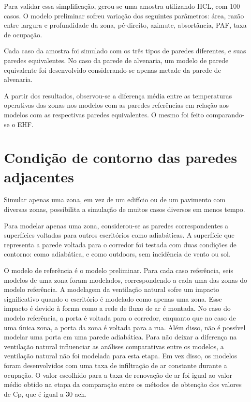 \documentclass[brazil,hardcopy,openany,a5paper]{ufscthesis}
\begin{document}
		Para validar essa simplificação, gerou-se uma amostra utilizando HCL, com 100 casos. O modelo preliminar sofreu variação dos seguintes parâmetros: área, razão entre largura e profundidade da zona, pé-direito, azimute, absortância, PAF, taxa de ocupação.
		
		Cada caso da amostra foi simulado com os três tipos de paredes diferentes, e suas paredes equivalentes. No caso da parede de alvenaria, um modelo de parede equivalente foi desenvolvido considerando-se apenas metade da parede de alvenaria.
		
		A partir dos resultados, observou-se a diferença média entre as temperaturas operativas das zonas nos modelos com as paredes referências em relação aos modelos com as respectivas paredes equivalentes. O mesmo foi feito comparando-se o EHF.
		
		\section{Condição de contorno das paredes adjacentes}
		
		Simular apenas uma zona, em vez de um edifício ou de um pavimento com diversas zonas, possibilita a simulação de muitos casos diversos em menos tempo.
		
		Para modelar apenas uma zona, considerou-se as paredes correspondentes a superfícies voltadas para outros escritórios como adiabáticas. A superfície que representa a parede voltada para o corredor foi testada com duas condições de contorno: como adiabática, e como outdoors, sem incidência de vento ou sol.
		
		O modelo de referência é o modelo preliminar. Para cada caso referência, seis modelos de uma zona foram modelados, correspondendo a cada uma das zonas do modelo referência. A modelagem da ventilação natural sofre um impacto significativo quando o escritório é modelado como apenas uma zona. Esse impacto é devido à forma como a rede de fluxo de ar é montada. No caso do modelo referência, a porta é voltada para o corredor, enquanto que no caso de uma única zona, a porta da zona é voltada para a rua. Além disso, não é possível modelar uma porta em uma parede adiabática. Para não deixar a diferença na ventilação natural influenciar as análises comparativas entre os modelos, a ventilação natural não foi modelada para esta etapa. Em vez disso, os modelos foram desenvolvidos com uma taxa de infiltração de ar constante durante a ocupação. O valor escolhido para a taxa de renovação de ar foi igual ao valor médio obtido na etapa da comparação entre os métodos de obtenção dos valores de Cp, que é igual a 30 ach.
		
\end{document}

